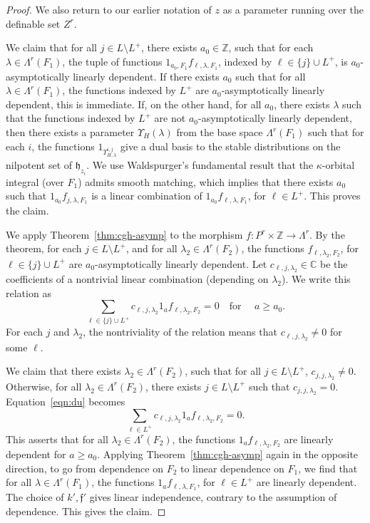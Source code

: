 \documentclass[12pt]{amsart}
\newcommand{\ring}[1]{{\mathbb #1}}
\def\Y{\Upsilon}
\def\s{{\mathfrak{f}}}
\newcommand{\fh}{\mathfrak{h}}
\theoremstyle{plain}
\theoremstyle{definition}
\begin{document}
\begin{proof}
We also return to our earlier notation of $z$ as a
parameter running over the definable set $Z^r$.



We claim that for all $j \in L\setminus L^+$, there exists
$a_0\in\ring{Z}$, such that for each $\lambda\in \Lambda^r(F_1)$, the
tuple of functions $1_{a_0,F_1}f_{\ell,\lambda,F_1}$, indexed by $\ell\in \{j\}\cup
L^+$, is $a_0$-asymptotically linearly dependent.  If there
exists $a_0$ such that for all $\lambda\in \Lambda^r(F_1)$, the
functions indexed by $L^+$ are $a_0$-asymptotically linearly
dependent, this is immediate.  If, on the other hand, for all $a_0$,
there exists $\lambda$ such that the functions indexed by $L^+$
are not $a_0$-asymptotically linearly dependent, then there exists a
parameter $\Y_H(\lambda)$ from the base space $\Lambda^r(F_1)$ such
that for each $i$, the functions $1_{\Y_{H,\lambda}^{i,j}}$ give a
dual basis to the stable distributions on the nilpotent set of
$\fh_{z_i}$.  We use Waldspurger's fundamental result
\cite{waldspurger1997lemme} that the $\kappa$-orbital integral (over
$F_1$) admits smooth matching, which implies that there exists $a_0$
such that $1_{a_0}f_{j,\lambda,F_1}$ is a linear combination of
$1_{a_0}f_{\ell,\lambda,F_1}$, for $\ell\in L^+$.  This proves the
claim.


We apply Theorem~\ref{thm:cgh-asymp} to the morphism $f:P^r\times\ring{Z}\to \Lambda^r$.  
By the theorem, for each
$j\in L\setminus L^+$, and for all $\lambda_2\in \Lambda^r({F_2})$, the
functions $f_{\ell,\lambda_2,F_2}$, for $\ell\in \{j\}\cup L^+$ are
$a_0$-asymptotically linearly dependent.  Let $c_{\ell,j,\lambda_2}\in
\ring{C}$ be the coefficients of a nontrivial linear combination
(depending on $\lambda_2$).  We write this relation as
\begin{equation}\label{eqn:du}
\sum_{\ell\in \{j\}\cup L^+} c_{\ell,j,\lambda_2}1_af_{\ell,\lambda_2,F_2}  =
0\quad\text{for }\quad a\ge a_0.
\end{equation}
For each $j$ and $\lambda_2$, the nontriviality of the relation
means
that $c_{\ell,j,\lambda_2}\ne 0$ for some $\ell$.

We claim that there exists $\lambda_2\in \Lambda^r({F_2})$, such that for all $j\in
L\setminus L^+$,
$c_{j,j,\lambda_2}\ne 0$.  Otherwise, for all $\lambda_2\in \Lambda^r(F_2)$, there exists
$j\in L\setminus L^+$ such that $c_{j,j,\lambda_2}=0$.  Equation~\ref{eqn:du}
becomes
\begin{equation}\label{eqn:du2}
\sum_{\ell\in L^+} c_{\ell,j,\lambda_2}1_af_{\ell,\lambda_2,F_2}  = 0.
\end{equation}
This asserts that for all $\lambda_2\in \Lambda^r(F_2)$, the functions
$1_af_{\ell,\lambda_2,F_2}$ are linearly dependent for $a\ge a_0$.  Applying
Theorem~\ref{thm:cgh-asymp} again in the opposite direction, to go from
dependence on $F_2$ to linear dependence on $F_1$, we find that for all
$\lambda\in \Lambda^r(F_1)$, the functions $1_af_{\ell,\lambda,F_1}$, for $\ell\in L^+$ are linearly
dependent.  The choice of $k',\s'$ gives linear independence, contrary to
the assumption of dependence.  This gives the claim.


\end{proof}
\end{document}
